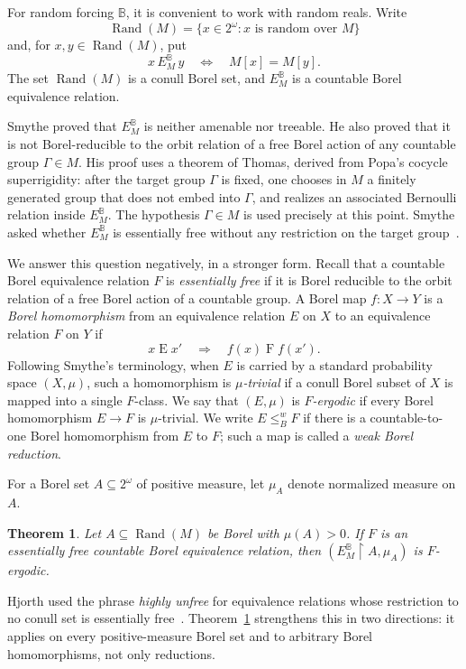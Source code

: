 \documentclass[11pt]{amsart}
\newtheorem{theorem}{Theorem}[section]
\theoremstyle{definition}
\theoremstyle{remark}
\newcommand{\B}{\mathbb B}
\newcommand{\Rand}{\operatorname{Rand}}
\newcommand{\restr}{\mathbin{\upharpoonright}}
\newcommand{\EBM}{E^{\B}_{M}}
\newcommand{\leBw}{\mathrel{\leq^{w}_{B}}}
\begin{document}
\newpage
\mbox{}\par
\vspace{\baselineskip}
For random forcing $\B$, it is convenient to work with random reals.  Write
\[
 \Rand(M)=\{x\in 2^\omega:x\text{ is random over }M\}
\]
and, for $x,y\in\Rand(M)$, put
\[
 x\,\EBM\,y
 \quad\Longleftrightarrow\quad
 M[x]=M[y].
\]
The set $\Rand(M)$ is a conull Borel set, and $\EBM$ is a countable Borel equivalence relation.

Smythe proved that $\EBM$ is neither amenable nor treeable.  He also proved that it is not Borel-reducible to the orbit relation of a free Borel action of any countable group $\Gamma\in M$.  His proof uses a theorem of Thomas, derived from Popa's cocycle superrigidity: after the target group $\Gamma$ is fixed, one chooses in $M$ a finitely generated group that does not embed into $\Gamma$, and realizes an associated Bernoulli relation inside $\EBM$.  The hypothesis $\Gamma\in M$ is used precisely at this point.  Smythe asked whether $\EBM$ is essentially free without any restriction on the target group~\cite[Question~5.3]{Smythe}.

We answer this question negatively, in a stronger form.  Recall that a countable Borel equivalence relation $F$ is \emph{essentially free} if it is Borel reducible to the orbit relation of a free Borel action of a countable group.  A Borel map $f\colon X\to Y$ is a \emph{Borel homomorphism} from an equivalence relation $E$ on $X$ to an equivalence relation $F$ on $Y$ if
\[
 x\mathrel{E}x'\quad\Longrightarrow\quad f(x)\mathrel{F}f(x').
\]
Following Smythe's terminology, when $E$ is carried by a standard probability space $(X,\mu)$, such a homomorphism is \emph{$\mu$-trivial} if a conull Borel subset of $X$ is mapped into a single $F$-class.  We say that $(E,\mu)$ is \emph{$F$-ergodic} if every Borel homomorphism $E\to F$ is $\mu$-trivial.  We write $E\leBw F$ if there is a countable-to-one Borel homomorphism from $E$ to $F$; such a map is called a \emph{weak Borel reduction}.

For a Borel set $A\subseteq2^\omega$ of positive measure, let $\mu_A$ denote normalized measure on $A$.

\begin{theorem}\label{thm:main}
Let $A\subseteq\Rand(M)$ be Borel with $\mu(A)>0$.  If $F$ is an essentially free countable Borel equivalence relation, then $(\EBM\restr A,\mu_A)$ is $F$-ergodic.
\end{theorem}

Hjorth used the phrase \emph{highly unfree} for equivalence relations whose restriction to no conull set is essentially free~\cite{Hjorth}.  Theorem~\ref{thm:main} strengthens this in two directions: it applies on every positive-measure Borel set and to arbitrary Borel homomorphisms, not only reductions.
\end{document}

